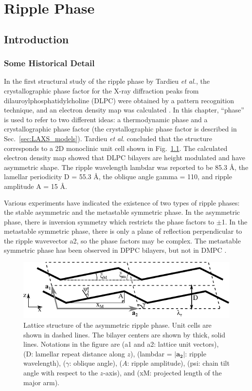 \chapter{Ripple Phase}\label{chap:ripple}
\section{Introduction}\label{sec:ripple_introduction}
\subsection{Some Historical Detail}
In the first structural study of the ripple phase by Tardieu \textit{et al.},
the crystallographic phase factor for the X-ray diffraction peaks from 
dilauroylphosphatidylcholine (\acs{DLPC}) were obtained
by a pattern recognition technique, and an electron density map was calculated
\cite{ref:Tardieu73}. 
In this chapter, ``phase'' is used to refer to two different ideas: a thermodynamic phase
and a crystallographic phase factor (the crystallographic phase factor is described in
Sec.~\ref{sec:LAXS_models}).
Tardieu \textit{et al.} concluded that the structure
corresponds to a 2D monoclinic unit cell shown in Fig.~\ref{fig:unit_cell}.
The calculated 
electron density map showed that DLPC bilayers are height modulated
and have asymmetric shape. 
The ripple wavelength \gls{lambdar} was reported to be 85.3 \AA, 
the lamellar periodicity \gls{D} = 55.3 \AA, the oblique angle
\gls{gamma} = 110\textdegree, and ripple amplitude \gls{A} = 15 \AA.

Various experiments have indicated the existence of two types of ripple phases:
the stable asymmetric and the metastable symmetric phase. In the asymmetric
phase, there is inversion symmetry
which restricts the phase factors to $\pm$1.
In the metastable symmetric phase, there is only 
a plane of reflection perpendicular to the ripple wavevector \gls{a2},
so the phase factors may be complex. 
The metastable symmetric phase has been observed in DPPC bilayers, but not
in DMPC \cite{ref:Koynova96,ref:Katsaras00}.

\begin{figure}[htbp]
  \centering
  \includegraphics[width=\textwidth]{figures/ripple/unit_cell}
  \caption[Lattice structure of the asymmetric ripple phase]
  {Lattice structure of the asymmetric ripple phase. Unit cells are shown in
  dashed lines. The bilayer centers are shown by thick, solid lines. Notations 
  in the figure are (\gls{a1} and \gls{a2}: lattice unit vectors),
  (\gls{D}: lamellar repeat distance along $z$), 
  (\gls{lambdar} = $|\mathbf{a_2}|$: ripple wavelength), 
  ($\gamma$: oblique angle), ($A$: ripple amplitude),
  (\gls{psi}: chain tilt angle with respect to the $z$-axis),
  and (\gls{xM}: projected length of the major arm).}
  \label{fig:unit_cell}
\end{figure}

